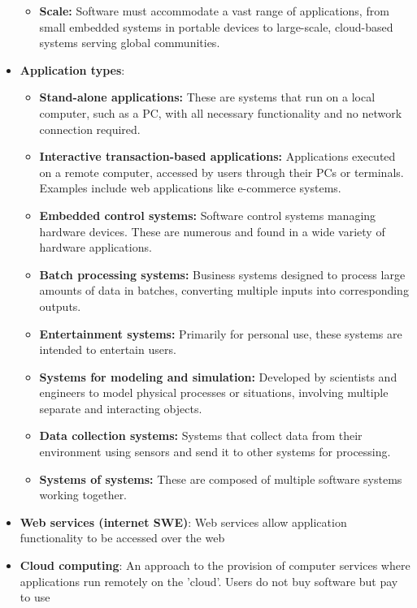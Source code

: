 \documentclass{report}
\begin{document}
\begin{itemize}
\begin{itemize}[noitemsep]
                \item \textbf{Scale:} Software must accommodate a vast range of applications, from small embedded systems in portable devices to large-scale, cloud-based systems serving global communities.
            \end{itemize}
        \item \textbf{Application types}:
            \begin{itemize}[noitemsep]
                \item \textbf{Stand-alone applications:} These are systems that run on a local computer, such as a PC, with all necessary functionality and no network connection required.
                \item \textbf{Interactive transaction-based applications:} Applications executed on a remote computer, accessed by users through their PCs or terminals. Examples include web applications like e-commerce systems.
                \item \textbf{Embedded control systems:} Software control systems managing hardware devices. These are numerous and found in a wide variety of hardware applications.
                \item \textbf{Batch processing systems:} Business systems designed to process large amounts of data in batches, converting multiple inputs into corresponding outputs.
                \item \textbf{Entertainment systems:} Primarily for personal use, these systems are intended to entertain users.
                \item \textbf{Systems for modeling and simulation:} Developed by scientists and engineers to model physical processes or situations, involving multiple separate and interacting objects.
                \item \textbf{Data collection systems:} Systems that collect data from their environment using sensors and send it to other systems for processing.
                \item \textbf{Systems of systems:} These are composed of multiple software systems working together.
            \end{itemize}
        \item \textbf{Web services (internet SWE)}: Web services allow application functionality to be accessed over the web
        \item \textbf{Cloud computing}: An approach to the provision of computer services where applications run remotely on the 'cloud'. Users do not buy software but pay to use

\end{itemize}
\end{document}
